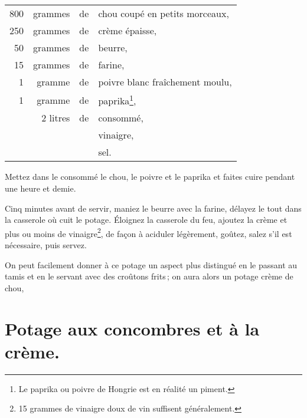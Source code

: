 \footnotesize
\begin{longtable}{rrrp{16em}}                                                    
    800 & grammes  & de & chou coupé en petits morceaux,                                                  \\
    250 & grammes  & de & crème épaisse,                                                                  \\
     50 & grammes  & de & beurre,                                                                         \\
     15 & grammes  & de & farine,                                                                         \\
      1 & gramme   & de & poivre blanc fraîchement moulu,                                                 \\
      1 & gramme   & de & paprika\footnote{Le paprika ou poivre de Hongrie                               
                         est en réalité un piment.},                                                      \\
        & 2 litres & de & consommé,                                                                       \\
        &          &    & vinaigre,                                                                       \\
        &          &    & sel.                                                                            \\
\end{longtable}
\normalsize

Mettez dans le consommé le chou, le poivre et le paprika et faites cuire
pendant une heure et demie.

Cinq minutes avant de servir, maniez le beurre avec la farine, délayez le tout
dans la casserole où cuit le potage. Éloignez la casserole du feu, ajoutez la
crème et plus ou moins de vinaigre\footnote{15 grammes de vinaigre doux de vin
suffisent généralement.}, de façon à aciduler légèrement, goûtez, salez s'il
est nécessaire, puis servez.

\sk

On peut facilement donner à ce potage un aspect plus distingué en le passant au
tamis et en le servant avec des croûtons frits ; on aura alors un potage crème
de chou,

\section*{\centering Potage aux concombres et à la crème.}

